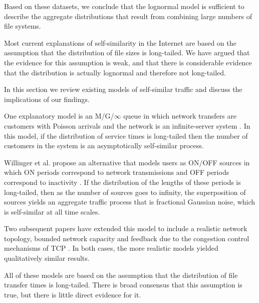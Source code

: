 \documentclass[10pt,twocolumn]{article}
\begin{document}
Based on these datasets, we conclude that the lognormal model
is sufficient to describe the aggregate distributions that result
from combining large numbers of file systems.



Most current explanations of self-similarity in the Internet
are based on the assumption that the distribution of file sizes
is long-tailed.  We have argued that the evidence for this
assumption is weak, and that there is considerable evidence
that the distribution is actually lognormal and therefore
not long-tailed.

In this section we review existing models of
self-similar traffic and discuss the implications of our
findings.

One explanatory model is an M/G/$\infty$ queue in which
network transfers are customers with Poisson arrivals and the network
is an infinite-server system \cite{PaxsonFloyd95}
\cite{ParulekarMakowski96}.  In this model, if the distribution of
service times is long-tailed then the number of customers in the
system is an asymptotically self-similar process.

Willinger et al. propose an alternative that models
users as ON/OFF sources in which ON periods correspond to network
transmissions and OFF periods correspond to inactivity
\cite{WillingerTaqquShermanWilson95}.  If the distribution of the
lengths of these periods is long-tailed, then as the number of sources
goes to infinity, the superposition of sources yields an aggregate
traffic process that is fractional Gaussian noise, which is
self-similar at all time scales.


Two subsequent papers have extended this model to include a realistic
network topology, bounded network capacity and feedback due to the
congestion control mechanisms of TCP \cite{ParkKimCrovella96}
\cite{FeldmannGilbertHuangWillinger99}.  In both cases, the more
realistic models yielded qualitatively similar results.

All of these models are based on the assumption that the distribution
of file transfer times is long-tailed.  There is broad consensus that
this assumption is true, but there is little direct evidence for it.
\end{document}

